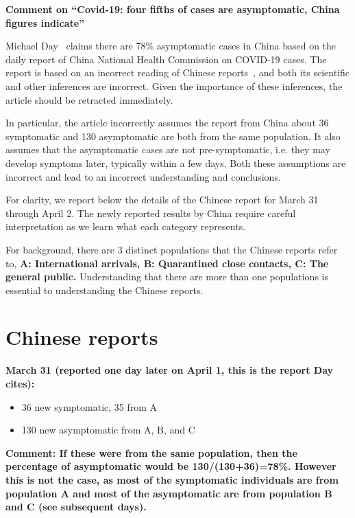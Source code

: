 \documentclass[onecolumn,journal]{IEEEtran}
\begin{document}
\begin{multicols}{2}
\textbf{Comment on ``Covid-19: four fifths of cases are asymptomatic, China figures indicate''}

Michael Day~\cite{day} claims there are 78\% asymptomatic cases in China based on the daily report of China National Health Commission on COVID-19 cases. The report is based on an incorrect reading of Chinese reports~\cite{data}, and both its scientific and other inferences are incorrect. Given the importance of these inferences, the article should be retracted immediately. 

In particular,  the article incorrectly assumes the report from China about 36 symptomatic and 130 asymptomatic are both from the same population. It also assumes that the asymptomatic cases are not pre-symptomatic, i.e. they may develop symptoms later, typically within a few days. Both these assumptions are incorrect and lead to an incorrect understanding and conclusions. 

For clarity, we report below the details of the Chinese report for March 31 through April 2. The newly reported results by China require careful interpretation as we learn what each category represents.

For background, there are 3 distinct populations that the Chinese reports refer to, \textbf{A: International arrivals, B: Quarantined close contacts, C: The general public.} Understanding that there are more than one populations is essential to understanding the Chinese reports.


\par   

\section*{Chinese reports}

\bigskip
\textbf{March 31 (reported one day later on April 1, this is the report Day\cite{day} cites):}
\begin{itemize}
    \item 36 new symptomatic, 35 from A
    \item 130 new asymptomatic from A, B, and C
\end{itemize}
\textbf{Comment: If these were from the same population, then the percentage of asymptomatic would be 130/(130+36)=78\%. However this is not the case, as most of the symptomatic individuals are from population A and most of the asymptomatic are from population B and C (see subsequent days).}


\end{multicols}
\end{document}

